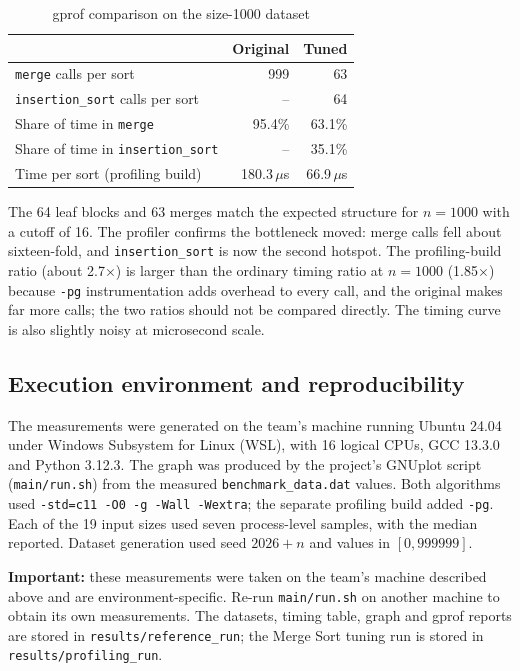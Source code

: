 \documentclass[12pt,a4paper,oneside]{report}
\begin{document}
\begin{table}[H]\centering
\caption{gprof comparison on the size-1000 dataset}
\begin{tabular}{lrr}
\toprule
 & \textbf{Original} & \textbf{Tuned}\\
\midrule
\texttt{merge} calls per sort & 999 & 63\\
\texttt{insertion\_sort} calls per sort & -- & 64\\
Share of time in \texttt{merge} & 95.4\% & 63.1\%\\
Share of time in \texttt{insertion\_sort} & -- & 35.1\%\\
Time per sort (profiling build) & 180.3\,$\mu$s & 66.9\,$\mu$s\\
\bottomrule
\end{tabular}
\end{table}

The 64 leaf blocks and 63 merges match the expected structure for $n=1000$ with a cutoff of 16. The profiler confirms the bottleneck moved: merge calls fell about sixteen-fold, and \texttt{insertion\_sort} is now the second hotspot. The profiling-build ratio (about 2.7$\times$) is larger than the ordinary timing ratio at $n=1000$ (1.85$\times$) because \texttt{-pg} instrumentation adds overhead to every call, and the original makes far more calls; the two ratios should not be compared directly. The timing curve is also slightly noisy at microsecond scale.


\subsection{Execution environment and reproducibility}
The measurements were generated on the team's machine running Ubuntu 24.04 under Windows Subsystem for Linux (WSL), with 16 logical CPUs, GCC 13.3.0 and Python 3.12.3. The graph was produced by the project's GNUplot script (\texttt{main/run.sh}) from the measured \texttt{benchmark\_data.dat} values. Both algorithms used \texttt{-std=c11 -O0 -g -Wall -Wextra}; the separate profiling build added \texttt{-pg}. Each of the 19 input sizes used seven process-level samples, with the median reported. Dataset generation used seed $2026+n$ and values in $[0,999999]$.

\textbf{Important:} these measurements were taken on the team's machine described above and are environment-specific. Re-run \texttt{main/run.sh} on another machine to obtain its own measurements. The datasets, timing table, graph and gprof reports are stored in \texttt{results/reference\_run}; the Merge Sort tuning run is stored in \texttt{results/profiling\_run}.
\end{document}
